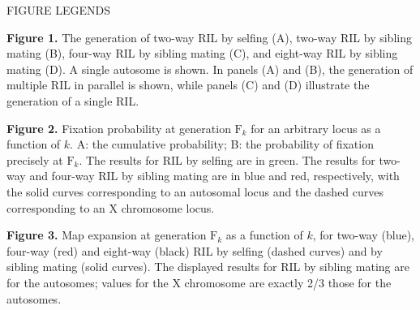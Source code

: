 \documentclass[12pt,letterpaper]{article}
\newenvironment{hanging}
{\begin{list}{}
        {\setlength{\labelwidth}{0in}
         \setlength{\leftmargin}{1em}
         \setlength{\itemindent}{-1em}
        }
}
{\end{list}}
\begin{document}
\newpage


\centerline{FIGURE LEGENDS}

\begin{hanging}

\item \textbf{Figure 1.} 
  The generation of two-way RIL by selfing (A),
  two-way RIL by sibling mating (B), four-way RIL by sibling mating
  (C), and eight-way RIL by sibling mating (D).  A single autosome is
  shown.  In panels (A) and (B), the generation of multiple RIL in
  parallel is shown, while panels (C) and (D) illustrate the
  generation of a single RIL.

\item \textbf{Figure 2.}
  Fixation probability at generation $\text{F}_k$ for an arbitrary locus 
  as a function of $k$.  A: the cumulative probability; B:
  the probability of fixation precisely at $\text{F}_k$.
  The results for RIL by selfing are in green.  The results for
  two-way and four-way RIL by sibling mating are in blue and red,
  respectively, with the solid curves corresponding to an autosomal
  locus and the dashed curves corresponding to an X chromosome locus. 

\item \textbf{Figure 3.}  
  Map expansion at generation $\text{F}_k$ as a function of $k$, for
  two-way (blue), four-way (red) and eight-way (black) RIL by
  selfing (dashed curves) and by sibling mating (solid curves).  The
  displayed results for RIL by sibling mating are for the autosomes;
  values for the X chromosome are exactly 2/3 those for the autosomes.

\end{hanging}

\newpage

\end{document}
